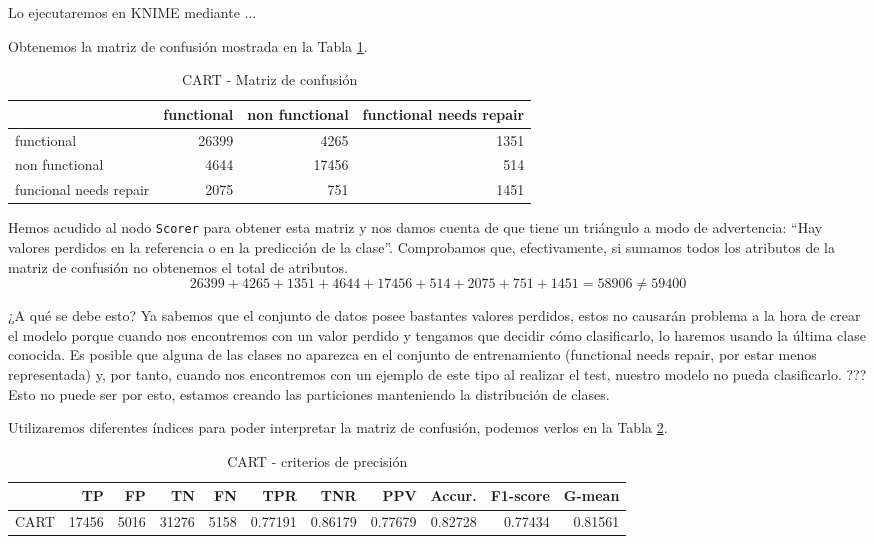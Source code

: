 \documentclass[a4paper, 20pt]{article}
\begin{document}
Lo ejecutaremos en KNIME mediante ... %

Obtenemos la matriz de confusión mostrada en la Tabla \ref{tab:CMTree}.

\begin{table}[H]
  \centering
  \caption{CART - Matriz de confusión}
  \label{tab:CMTree}
  \begin{tabular}{lrrr}
    \toprule
    & functional & non functional & functional needs repair\\ \midrule
    functional & 26399 & 4265 & 1351\\
    non functional & 4644 & 17456 & 514\\
    funcional needs repair & 2075 & 751 & 1451\\
    \bottomrule
  \end{tabular}
\end{table}

Hemos acudido al nodo \texttt{Scorer} para obtener esta matriz y nos damos cuenta de que tiene un triángulo a modo de advertencia: ``Hay valores perdidos en la referencia o en la predicción de la clase''. Comprobamos que, efectivamente, si sumamos todos los atributos de la matriz de confusión no obtenemos el total de atributos.
\[26399 + 4265 + 1351 + 4644 + 17456 + 514 + 2075 + 751 + 1451 = 58906 \neq 59400
\]

¿A qué se debe esto? Ya sabemos que el conjunto de datos posee bastantes valores perdidos, estos no causarán problema a la hora de crear el modelo porque cuando nos encontremos con un valor perdido y tengamos que decidir cómo clasificarlo, lo haremos usando la última clase conocida. Es posible que alguna de las clases no aparezca en el conjunto de entrenamiento (functional needs repair, por estar menos representada) y, por tanto, cuando nos encontremos con un ejemplo de este tipo al realizar el test, nuestro modelo no pueda clasificarlo. ??? Esto no puede ser por esto, estamos creando las particiones manteniendo la distribución de clases.

Utilizaremos diferentes índices para poder interpretar la matriz de confusión, podemos verlos en la Tabla \ref{tab:Tree}. 

\begin{table}[H]
  \centering
  \caption{CART - criterios de precisión}
  \label{tab:Tree}
  \begin{tabular}{lrrrrrrrrrr}
    \toprule
    & TP & FP & TN & FN & TPR & TNR & PPV & Accur. & F1-score & G-mean\\ \midrule
CART  & 17456 & 5016 & 31276 & 5158 & 0.77191 & 0.86179 & 0.77679 & 0.82728 & 0.77434 & 0.81561\\
\bottomrule
  \end{tabular}
\end{table}
\end{document}
